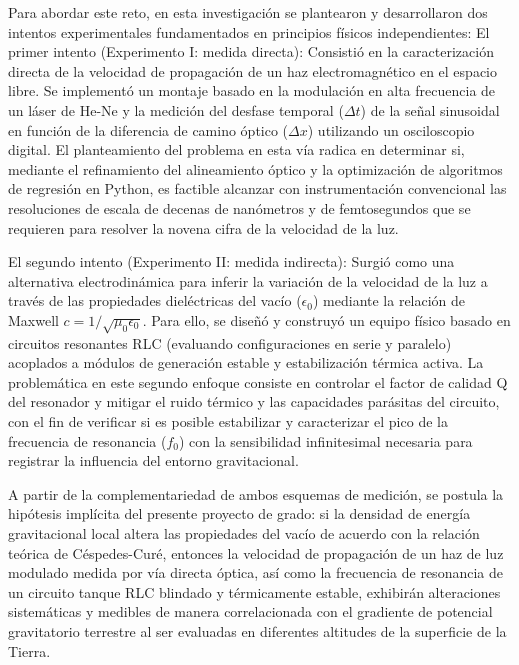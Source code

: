 Para abordar este reto, en esta investigación se plantearon y desarrollaron dos intentos experimentales fundamentados en principios físicos independientes:
El primer intento (Experimento I: medida directa): Consistió en la caracterización directa de la velocidad de propagación de un haz electromagnético en el espacio libre. Se implementó un montaje basado en la modulación en alta frecuencia de un láser de He-Ne y la medición del desfase temporal ($\Delta t$) de la señal sinusoidal en función de la diferencia de camino óptico ($\Delta x$) utilizando un osciloscopio digital. El planteamiento del problema en esta vía radica en determinar si, mediante el refinamiento del alineamiento óptico y la optimización de algoritmos de regresión en Python, es factible alcanzar con instrumentación convencional las resoluciones de escala de decenas de nanómetros y de femtosegundos que se requieren para resolver la novena cifra de la velocidad de la luz.

El segundo intento (Experimento II: medida indirecta): Surgió como una alternativa electrodinámica para inferir la variación de la velocidad de la luz a través de las propiedades dieléctricas del vacío ($\epsilon_0$) mediante la relación de Maxwell $c=1/ \sqrt{\mu_0\epsilon_0}$. Para ello, se diseñó y construyó un equipo físico basado en circuitos resonantes RLC (evaluando configuraciones en serie y paralelo) acoplados a módulos de generación estable y estabilización térmica activa. La problemática en este segundo enfoque consiste en controlar el factor de calidad Q del resonador y mitigar el ruido térmico y las capacidades parásitas del circuito, con el fin de verificar si es posible estabilizar y caracterizar el pico de la frecuencia de resonancia ($f_0$) con la sensibilidad infinitesimal necesaria para registrar la influencia del entorno gravitacional.



A partir de la complementariedad de ambos esquemas de medición, se postula la hipótesis implícita del presente proyecto de grado: si la densidad de energía gravitacional local altera las propiedades del vacío de acuerdo con la relación teórica de Céspedes-Curé, entonces la velocidad de propagación de un haz de luz modulado medida por vía directa óptica, así como la frecuencia de resonancia de un circuito tanque RLC blindado y térmicamente estable, exhibirán alteraciones sistemáticas y medibles de manera correlacionada con el gradiente de potencial gravitatorio terrestre al ser evaluadas en diferentes altitudes de la superficie de la Tierra.

